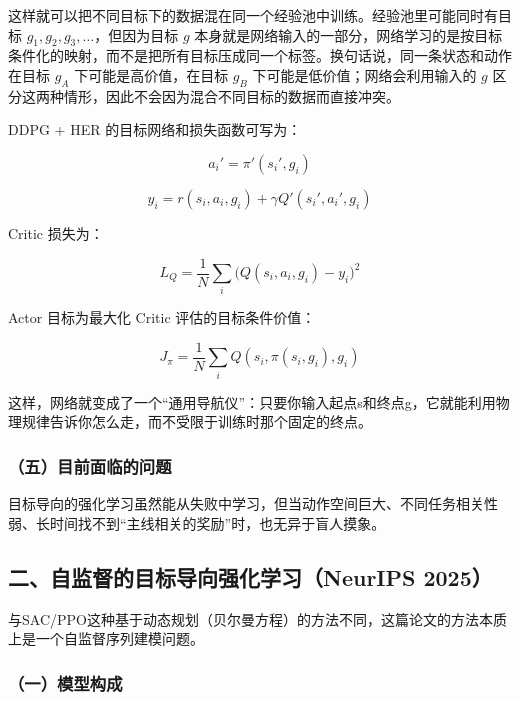 这样就可以把不同目标下的数据混在同一个经验池中训练。经验池里可能同时有目标 \(g_1,g_2,g_3,\ldots\)，但因为目标 \(g\) 本身就是网络输入的一部分，网络学习的是按目标条件化的映射，而不是把所有目标压成同一个标签。换句话说，同一条状态和动作在目标 \(g_A\) 下可能是高价值，在目标 \(g_B\) 下可能是低价值；网络会利用输入的 \(g\) 区分这两种情形，因此不会因为混合不同目标的数据而直接冲突。

DDPG + HER 的目标网络和损失函数可写为：

\[
a_i'=\pi'(s_i',g_i)
\]

\[
y_i
=
r(s_i,a_i,g_i)
+
\gamma Q'(s_i',a_i',g_i)
\]

Critic 损失为：

\[
L_Q
=
\frac{1}{N}
\sum_i
\bigl(
Q(s_i,a_i,g_i)-y_i
\bigr)^{2}
\]

Actor 目标为最大化 Critic 评估的目标条件价值：

\[
J_\pi
=
\frac{1}{N}
\sum_i
Q(s_i,\pi(s_i,g_i),g_i)
\]

这样，网络就变成了一个``通用导航仪''：只要你输入起点s和终点g，它就能利用物理规律告诉你怎么走，而不受限于训练时那个固定的终点。

\hypertarget{ux4e94ux76eeux524dux9762ux4e34ux7684ux95eeux9898}{%
\subsubsection{（五）目前面临的问题}\label{ux4e94ux76eeux524dux9762ux4e34ux7684ux95eeux9898}}

目标导向的强化学习虽然能从失败中学习，但当动作空间巨大、不同任务相关性弱、长时间找不到``主线相关的奖励''时，也无异于盲人摸象。

\hypertarget{ux4e8cux81eaux76d1ux7763ux7684ux76eeux6807ux5bfcux5411ux5f3aux5316ux5b66ux4e60neurips-2025}{%
\subsection{二、自监督的目标导向强化学习（NeurIPS 2025）}\label{ux4e8cux81eaux76d1ux7763ux7684ux76eeux6807ux5bfcux5411ux5f3aux5316ux5b66ux4e60neurips-2025}}

与SAC/PPO这种基于动态规划（贝尔曼方程）的方法不同，这篇论文的方法本质上是一个自监督序列建模问题。

\hypertarget{ux4e00ux6a21ux578bux6784ux6210}{%
\subsubsection{（一）模型构成}\label{ux4e00ux6a21ux578bux6784ux6210}}

